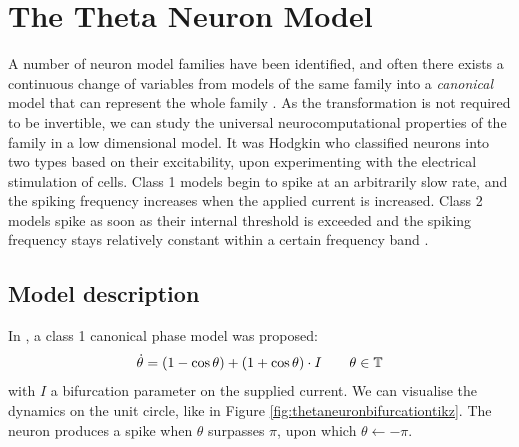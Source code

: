 \newpage
\section{The Theta Neuron Model} \label{TheThetaNeuronModel}
A number of neuron model families have been identified, and often there exists a continuous change of variables from models of the same family into a \textit{canonical} model that can represent the whole family \cite{Hoppensteadt2001CanonicalNM}. As the transformation is not required to be invertible, we can study the universal neurocomputational properties of the family in a low dimensional model.
It was Hodgkin \cite{Hodgkin1948} who classified neurons into two types based on their excitability, upon experimenting with the electrical stimulation of cells. Class 1 models begin to spike at an arbitrarily slow rate, and the spiking frequency increases when the applied current is increased. Class 2 models spike as soon as their internal threshold is exceeded and the spiking frequency stays relatively constant within a certain frequency band \cite{Hoppensteadt2001CanonicalNM}.

\subsection{Model description} \label{sec:TheThetaNeuronModelDescription}
In \cite{Ermentrout1986}, a class 1 canonical phase model was proposed:
\begin{align}
\dot{\theta} = (1-\cos \theta)+(1+\cos \theta) \cdot I \qquad \theta \in {\mathbb{T}} \label{eq:thetaneuron}
\end{align}
with $I$ a bifurcation parameter on the supplied current. We can visualise the dynamics on the unit circle, like in Figure \ref{fig:thetaneuronbifurcationtikz}. The neuron produces a spike when $\theta$ surpasses $\pi$, upon which $\theta \leftarrow -\pi$. 

